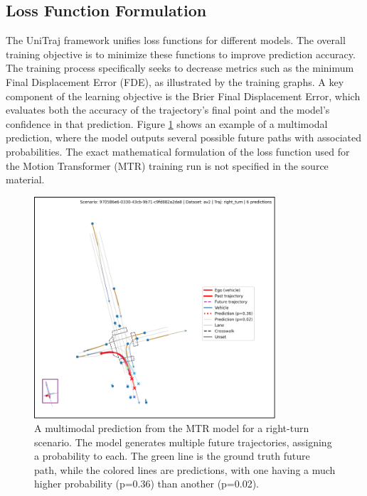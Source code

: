 \subsection{Loss Function Formulation}
The UniTraj framework unifies loss functions for different models. The overall training objective is to minimize these functions to improve prediction accuracy. The training process specifically seeks to decrease metrics such as the minimum Final Displacement Error (FDE), as illustrated by the training graphs. A key component of the learning objective is the Brier Final Displacement Error, which evaluates both the accuracy of the trajectory's final point and the model's confidence in that prediction. Figure \ref{fig:mtr_prediction} shows an example of a multimodal prediction, where the model outputs several possible future paths with associated probabilities. The exact mathematical formulation of the loss function used for the Motion Transformer (MTR) training run is not specified in the source material.
 
\begin{figure}[h!]
    \centering
    \includegraphics[width=0.8\textwidth]{figures/input_output_viz_ugly.png}
    \caption{A multimodal prediction from the MTR model for a right-turn scenario. The model generates multiple future trajectories, assigning a probability to each. The green line is the ground truth future path, while the colored lines are predictions, with one having a much higher probability (p=0.36) than another (p=0.02).}
    \label{fig:mtr_prediction}
\end{figure}
 
